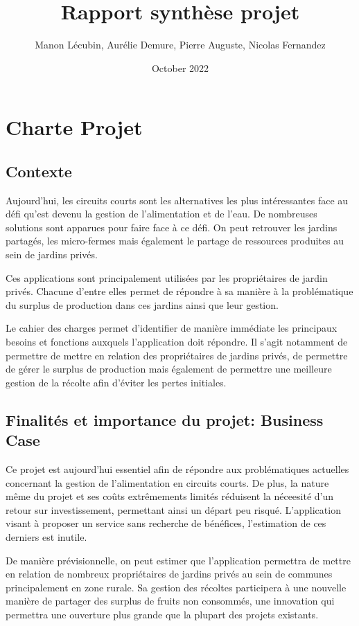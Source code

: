 \documentclass{article}
\title{Rapport synthèse projet}
\author{Manon Lécubin, Aurélie Demure, Pierre Auguste, Nicolas Fernandez}
\date{October 2022}
\begin{document}
\maketitle

\section{Charte Projet}

\subsection{Contexte}

Aujourd'hui, les circuits courts sont les alternatives les plus intéressantes face au défi qu'est devenu la gestion de l'alimentation et de l'eau. De nombreuses solutions sont apparues pour faire face à ce défi. On peut retrouver les jardins partagés, les micro-fermes mais également le partage de ressources produites au sein de jardins privés. 

Ces applications sont principalement utilisées par les propriétaires de jardin privés. Chacune d'entre elles permet de répondre à sa manière à la problématique du surplus de production dans ces jardins ainsi que leur gestion.

Le cahier des charges permet d'identifier de manière immédiate les principaux besoins et fonctions auxquels l'application doit répondre. Il s'agit notamment de permettre de mettre en relation des propriétaires de jardins privés, de permettre de gérer le surplus de production mais également de permettre une meilleure gestion de la récolte afin d'éviter les pertes initiales.


\subsection{Finalités et importance du projet: Business Case}

Ce projet est aujourd'hui essentiel afin de répondre aux problématiques actuelles concernant la gestion de l'alimentation en circuits courts. De plus, la nature même du projet et ses coûts extrêmements limités réduisent la néceesité d'un retour sur investissement, permettant ainsi un départ peu risqué. L'application visant à proposer un service sans recherche de bénéfices, l'estimation de ces derniers est inutile.

De manière prévisionnelle, on peut estimer que l'application permettra de mettre en relation de nombreux propriétaires de jardins privés au sein de communes principalement en zone rurale. Sa gestion des récoltes participera à une nouvelle manière de partager des surplus de fruits non consommés, une innovation qui permettra une ouverture plus grande que la plupart des projets existants.
\end{document}
